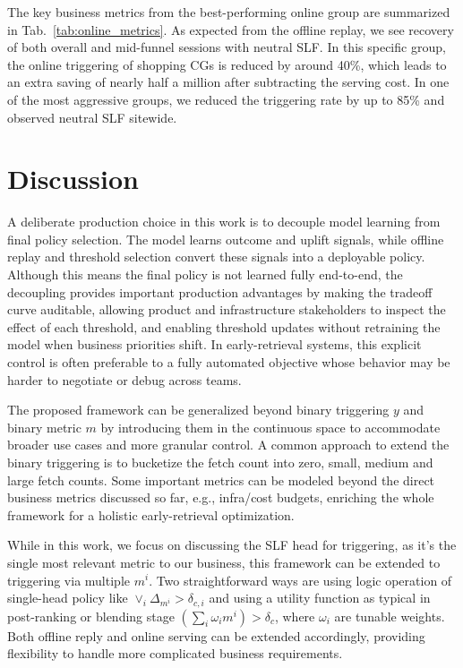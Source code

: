 \documentclass[sigconf, authorversion]{acmart}
\begin{document}
The key business metrics from the best-performing online group are summarized in Tab.~\ref{tab:online_metrics}. As expected from the offline replay, we see recovery of both overall and mid-funnel sessions with neutral SLF. In this specific group, the online triggering of shopping CGs is reduced by around 40\%, which leads to an extra saving of nearly half a million after subtracting the serving cost. In one of the most aggressive groups, we reduced the triggering rate by up to 85\% and observed neutral SLF sitewide.

\section{Discussion}
A deliberate production choice in this work is to decouple model learning from final policy selection. The model learns outcome and uplift signals, while offline replay and threshold selection convert these signals into a deployable policy. Although this means the final policy is not learned fully end-to-end, the decoupling provides important production advantages by making the tradeoff curve auditable, allowing product and infrastructure stakeholders to inspect the effect of each threshold, and enabling threshold updates without retraining the model when business priorities shift. In early-retrieval systems, this explicit control is often preferable to a fully automated objective whose behavior may be harder to negotiate or debug across teams.

The proposed framework can be generalized beyond binary triggering $y$ and binary metric $m$ by introducing them in the continuous space to accommodate broader use cases and more granular control. A common approach to extend the binary triggering is to bucketize the fetch count into zero, small, medium and large fetch counts.  Some important metrics can be modeled beyond the direct business metrics discussed so far, e.g., infra/cost budgets, enriching the whole framework for a holistic early-retrieval optimization.

While in this work, we focus on discussing the SLF head for triggering, as it's the single most relevant metric to our business, this framework can be extended to triggering via multiple $m^i$. Two straightforward ways are using logic operation of single-head policy like $\lor_i \Delta_{m^i}>\delta_{c,i}$ and using a utility function as typical in post-ranking or blending stage $\left(\sum_i \omega_im^i\right)>\delta_c$, where $\omega_i$ are tunable weights. Both offline reply and online serving can be extended accordingly, providing flexibility to handle more complicated business requirements.
\end{document}
